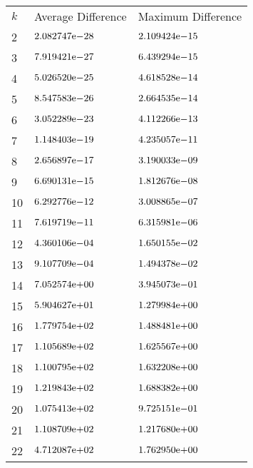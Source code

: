 \begin{table}[!tbh]
 \centering    
\begin{tabular}{ |p{1.5cm}| p{4cm}|| p{4cm}|}
\hline
 $k$  & Average Difference & Maximum Difference \\ \hhline{|=|=|=|}   
    2   & ${2.082747}\mathrm{e}{-28}$   & ${2.109424}\mathrm{e}{-15}$   \\
	3   & ${7.919421}\mathrm{e}{-27}$   & ${6.439294}\mathrm{e}{-15}$   \\
	4   & ${5.026520}\mathrm{e}{-25}$   & ${4.618528}\mathrm{e}{-14}$   \\
	5   & ${8.547583}\mathrm{e}{-26}$   & ${2.664535}\mathrm{e}{-14}$   \\
	6   & ${3.052289}\mathrm{e}{-23}$   & ${4.112266}\mathrm{e}{-13}$   \\
	7   & ${1.148403}\mathrm{e}{-19}$   & ${4.235057}\mathrm{e}{-11}$   \\
	8   & ${2.656897}\mathrm{e}{-17}$   & ${3.190033}\mathrm{e}{-09}$   \\
	9   & ${6.690131}\mathrm{e}{-15}$   & ${1.812676}\mathrm{e}{-08}$   \\
	10  & ${6.292776}\mathrm{e}{-12}$   & ${3.008865}\mathrm{e}{-07}$   \\
	11  & ${7.619719}\mathrm{e}{-11}$   & ${6.315981}\mathrm{e}{-06}$   \\
	12  & ${4.360106}\mathrm{e}{-04}$   & ${1.650155}\mathrm{e}{-02}$   \\
	13  & ${9.107709}\mathrm{e}{-04}$   & ${1.494378}\mathrm{e}{-02}$   \\
	14  & ${7.052574}\mathrm{e}{+00}$   & ${3.945073}\mathrm{e}{-01}$   \\
	15  & ${5.904627}\mathrm{e}{+01}$   & ${1.279984}\mathrm{e}{+00}$   \\
	16  & ${1.779754}\mathrm{e}{+02}$   & ${1.488481}\mathrm{e}{+00}$   \\
	17  & ${1.105689}\mathrm{e}{+02}$   & ${1.625567}\mathrm{e}{+00}$   \\
	18  & ${1.100795}\mathrm{e}{+02}$   & ${1.632208}\mathrm{e}{+00}$   \\
	19  & ${1.219843}\mathrm{e}{+02}$   & ${1.688382}\mathrm{e}{+00}$   \\
	20  & ${1.075413}\mathrm{e}{+02}$   & ${9.725151}\mathrm{e}{-01}$   \\
	21  & ${1.108709}\mathrm{e}{+02}$   & ${1.217680}\mathrm{e}{+00}$   \\
	22  & ${4.712087}\mathrm{e}{+02}$   & ${1.762950}\mathrm{e}{+00}$   \\

\end{tabular}
\end{table}
